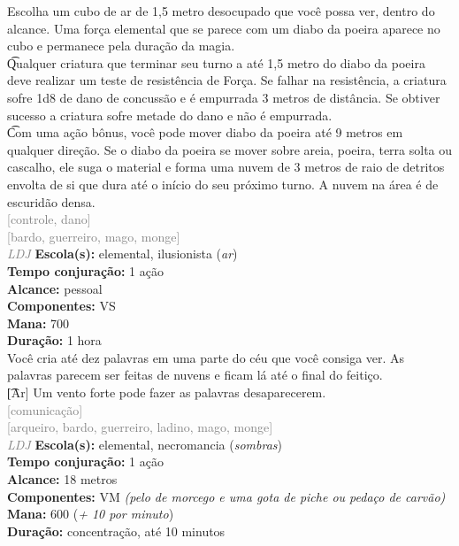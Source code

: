 \documentclass{RPG_Adventure}[2021/10/20]
\begin{document}
{\normalsize Escolha um cubo de ar de 1,5 metro desocupado que você possa ver, dentro do alcance. Uma força elemental que se parece com um diabo da poeira aparece no cubo e permanece pela duração da magia.\\\t Qualquer criatura que terminar seu turno a até 1,5 metro do diabo da poeira deve realizar um teste de resistência de Força. Se falhar na resistência, a criatura sofre 1d8 de dano de concussão e é empurrada 3 metros de distância. Se obtiver sucesso a criatura sofre metade do dano e não é empurrada.\\\t Com uma ação bônus, você pode mover diabo da poeira até 9 metros em qualquer direção. Se o diabo da poeira se mover sobre areia, poeira, terra solta ou cascalho, ele suga o material e forma uma nuvem de 3 metros de raio de detritos envolta de si que dura até o início do seu próximo turno. A nuvem na área é de escuridão densa.\\}
{\scriptsize \textcolor{gray}{[controle, dano]\\}}
{\scriptsize \textcolor{gray}{[bardo, guerreiro, mago, monge]\\}}
{\tiny \textcolor{gray}{\textit{LDJ}}}\jump{}
{\small \t \textbf{Escola(s):} elemental, ilusionista (\textit{ar})\\\t \textbf{Tempo conjuração:} 1 ação\\\t \textbf{Alcance:} pessoal\\\t \textbf{Componentes:} VS\\\t \textbf{Mana:} 700\\\t \textbf{Duração:} 1 hora\\}
{\normalsize Você cria até dez palavras em uma parte do céu que você consiga ver. As palavras parecem ser feitas de nuvens e ficam lá até o final do feitiço.\\\t [Ar] Um vento forte pode fazer as palavras desaparecerem.\\}
{\scriptsize \textcolor{gray}{[comunicação]\\}}
{\scriptsize \textcolor{gray}{[arqueiro, bardo, guerreiro, ladino, mago, monge]\\}}
{\tiny \textcolor{gray}{\textit{LDJ}}}\jump{}
{\small \t \textbf{Escola(s):} elemental, necromancia (\textit{sombras})\\\t \textbf{Tempo conjuração:} 1 ação\\\t \textbf{Alcance:} 18 metros\\\t \textbf{Componentes:} VM \textit{(pelo de morcego e uma gota de piche ou pedaço de carvão)}\\\t \textbf{Mana:} 600 (\textit{+ 10 por minuto})\\\t \textbf{Duração:} concentração, até 10 minutos\\}
\end{document}
